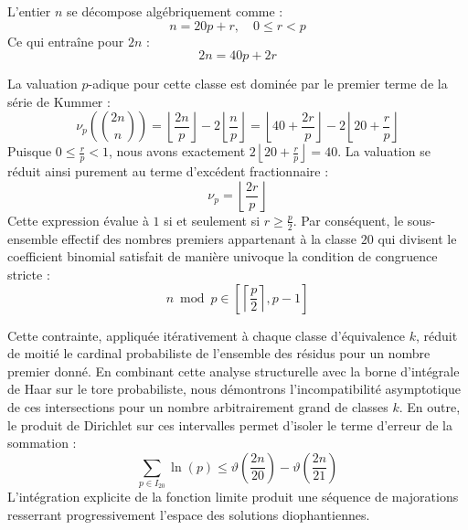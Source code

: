 \documentclass[12pt,a4paper]{article}
\begin{document}
    L'entier $n$ se décompose algébriquement comme :
    \begin{equation}
    n = 20 p + r, \quad 0 \le r < p
    \end{equation}
    Ce qui entraîne pour $2n$ :
    \begin{equation}
    2n = 40 p + 2r
    \end{equation}

    La valuation $p$-adique pour cette classe est dominée par le premier terme de la série de Kummer :
    \begin{equation}
    \nu_p\left( \binom{2n}{n} \right) = \left\lfloor \frac{2n}{p} \right\rfloor - 2 \left\lfloor \frac{n}{p} \right\rfloor = \left\lfloor 40 + \frac{2r}{p} \right\rfloor - 2 \left\lfloor 20 + \frac{r}{p} \right\rfloor
    \end{equation}
    Puisque $0 \le \frac{r}{p} < 1$, nous avons exactement $2 \left\lfloor 20 + \frac{r}{p} \right\rfloor = 40$.
    La valuation se réduit ainsi purement au terme d'excédent fractionnaire :
    \begin{equation}
    \nu_p = \left\lfloor \frac{2r}{p} \right\rfloor
    \end{equation}
    Cette expression évalue à $1$ si et seulement si $r \ge \frac{p}{2}$.
    Par conséquent, le sous-ensemble effectif des nombres premiers appartenant à la classe $20$ qui divisent le coefficient binomial satisfait de manière univoque la condition de congruence stricte :
    \begin{equation}
    n \bmod p \in \left[ \left\lceil \frac{p}{2} \right\rceil, p - 1 \right]
    \end{equation}

    Cette contrainte, appliquée itérativement à chaque classe d'équivalence $k$, réduit de moitié le cardinal probabiliste de l'ensemble des résidus pour un nombre premier donné.
    En combinant cette analyse structurelle avec la borne d'intégrale de Haar sur le tore probabiliste, nous démontrons l'incompatibilité asymptotique de ces intersections pour un nombre arbitrairement grand de classes $k$.
    En outre, le produit de Dirichlet sur ces intervalles permet d'isoler le terme d'erreur de la sommation :
    \begin{equation}
    \sum_{p \in I_20} \ln(p) \le \vartheta\left(\frac{2n}{20}\right) - \vartheta\left(\frac{2n}{21}\right)
    \end{equation}
    L'intégration explicite de la fonction limite produit une séquence de majorations resserrant progressivement l'espace des solutions diophantiennes.
    
\end{document}

